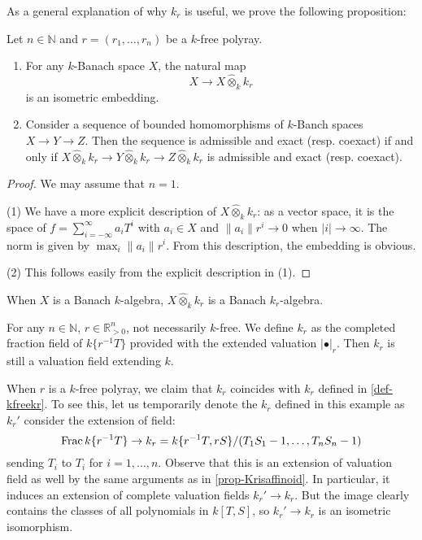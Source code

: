 As a general explanation of why $k_r$ is useful, we prove the following proposition:
\begin{proposition}\label{prop-Krfaithflat}
    Let $n\in \mathbb{N}$ and $r=(r_1,\ldots,r_n)$ be a $k$-free polyray.
    \begin{enumerate}
        \item For any $k$-Banach space $X$, the natural map
        \[
            X\rightarrow X\hat{\otimes}_k k_r    
        \]
        is an isometric embedding.
        \item Consider a sequence of bounded homomorphisms of $k$-Banch spaces $X\rightarrow Y\rightarrow Z$. Then the sequence is admissible and exact (resp. coexact) if and only if $X\hat{\otimes}_k k_r \rightarrow Y\hat{\otimes}_k k_r \rightarrow Z\hat{\otimes}_k k_r $ is admissible and exact (resp. coexact).
    \end{enumerate}
\end{proposition}
\begin{proof}
    We may assume that $n=1$. 

    (1) We have a more explicit description of $X\hat{\otimes}_k k_r$: as a vector space, it is the space of $f=\sum_{i=-\infty}^{\infty}a_i T^i$ with $a_i\in X$ and $\|a_i\|r^i\to 0$ when $|i|\to \infty$. The norm is given by $\max_i\|a_i\|r^i$. From this description, the embedding is obvious.

    (2) This follows easily from the explicit description in (1).
\end{proof}
When $X$ is a Banach $k$-algebra,  $X\hat{\otimes}_k k_r$ is a Banach $k_r$-algebra. 

\begin{example}\label{ex-generalkr}
    For any $n\in \mathbb{N}$, $r\in \mathbb{R}^n_{>0}$, not necessarily $k$-free. We define $k_r$ as the completed fraction field of $k\{r^{-1}T\}$ provided with the extended valuation $|\bullet|_r$. Then $k_r$ is still a valuation field extending $k$.
    
    When $r$ is a $k$-free polyray, we claim that $k_r$ coincides with $k_r$ defined in \cref{def-kfreekr}.
    To see this, let us temporarily denote the $k_r$ defined in this example as $k_r'$
    consider the extension of field:
    \[
        \operatorname{Frac} k\{r^{-1}T\}\rightarrow k_r=k\{r^{-1}T,rS\}/(T_1S_1-1,\ldots,T_nS_n-1) 
    \]
    sending $T_i$ to $T_i$ for $i=1,\ldots,n$. Observe that this is an extension of valuation field as well by the same arguments as in \cref{prop-Krisaffinoid}. In particular, it induces an extension of complete valuation fields $k_r'\rightarrow k_r$. But the image clearly contains the classes of all polynomials in $k[T,S]$, so $k_r'\rightarrow k_r$ is an isometric isomorphism.
\end{example}


